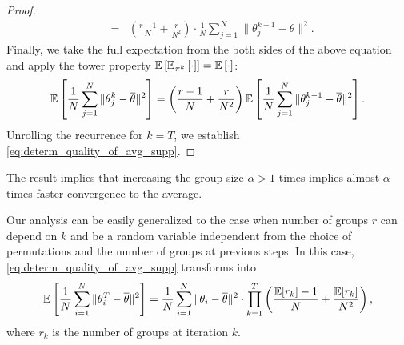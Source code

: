 \begin{proof}
\begin{eqnarray*}
    &=& \left(\frac{r-1}{N} + \frac{r}{N^2}\right)\cdot\frac{1}{N}\sum\limits_{j=1}^N\|\theta_j^{k-1} - \overline{\theta}\|^2.
\end{eqnarray*}
Finally, we take the full expectation from the both sides of the above equation and apply the tower property $\mathbb{E}\left[\mathbb{E}_{\pi^k}\left[\cdot\right]\right] = \mathbb{E}\left[\cdot\right]$:
\begin{equation*}
    \mathbb{E}\left[\frac{1}{N}\sum\limits_{j=1}^N\|\theta_j^k - \overline{\theta}\|^2\right] = \left(\frac{r-1}{N} + \frac{r}{N^2}\right)\mathbb{E}\left[\frac{1}{N}\sum\limits_{j=1}^N\|\theta_j^{k-1} - \overline{\theta}\|^2\right].
\end{equation*}
Unrolling the recurrence for $k=T$, we establish \eqref{eq:determ_quality_of_avg_supp}.
\end{proof}

\begin{remark}
    The result implies that increasing the group size $\alpha > 1$ times implies almost $\alpha$ times faster convergence to the average.
\end{remark}

\begin{remark}
    Our analysis can be easily generalized to the case when number of groups $r$ can depend on $k$ and be a random variable independent from the choice of permutations and the number of groups at previous steps. In this case, \eqref{eq:determ_quality_of_avg_supp} transforms into
    \begin{equation}
        \mathbb{E}\left[\frac{1}{N}\sum\limits_{i=1}^N\|\theta_i^T - \overline{\theta}\|^2\right] = \frac{1}{N}\sum\limits_{i=1}^N\|\theta_i - \overline{\theta}\|^2\cdot\prod_{k=1}^T\left(\frac{\mathbb{E}[r_k]-1}{N} + \frac{\mathbb{E}[r_k]}{N^2}\right), \label{eq:determ_quality_of_avg_generalized_supp}
    \end{equation}
    where $r_k$ is the number of groups at iteration $k$.
\end{remark}

